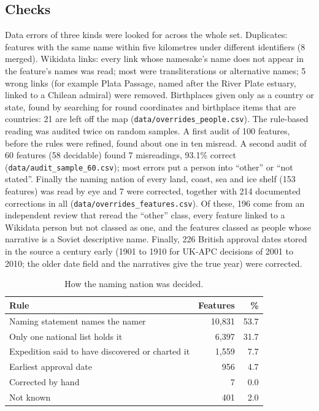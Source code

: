 \documentclass[11pt,a4paper]{article}
\begin{document}
\subsection{Checks}
Data errors of three kinds were looked for across the whole set. Duplicates: features with the same name within five kilometres under different identifiers (8 merged). Wikidata links: every link whose namesake's name does not appear in the feature's names was read; most were transliterations or alternative names; 5 wrong links (for example Plata Passage, named after the River Plate estuary, linked to a Chilean admiral) were removed. Birthplaces given only as a country or state, found by searching for round coordinates and birthplace items that are countries: 21 are left off the map (\texttt{data/overrides\_people.csv}). The rule-based reading was audited twice on random samples. A first audit of 100 features, before the rules were refined, found about one in ten misread. A second audit of 60 features (58 decidable) found 7 misreadings, 93.1\% correct (\texttt{data/audit\_sample\_60.csv}); most errors put a person into ``other'' or ``not stated''. Finally the naming nation of every land, coast, sea and ice shelf (153 features) was read by eye and 7 were corrected, together with 214 documented corrections in all (\texttt{data/overrides\_features.csv}). Of these, 196 come from an independent review that reread the ``other'' class, every feature linked to a Wikidata person but not classed as one, and the features classed as people whose narrative is a Soviet descriptive name. Finally, 226 British approval dates stored in the source a century early (1901 to 1910 for UK-APC decisions of 2001 to 2010; the older date field and the narratives give the true year) were corrected.

\begin{table}[tbp]\centering\small\caption{How the naming nation was decided.}\label{tab:src}\begin{tabular}{lrr}\toprule Rule & Features & \%\\\midrule
Naming statement names the namer & 10,831 & 53.7\\
Only one national list holds it & 6,397 & 31.7\\
Expedition said to have discovered or charted it & 1,559 & 7.7\\
Earliest approval date & 956 & 4.7\\
Corrected by hand & 7 & 0.0\\
Not known & 401 & 2.0\\
\bottomrule\end{tabular}\end{table}
\end{document}
